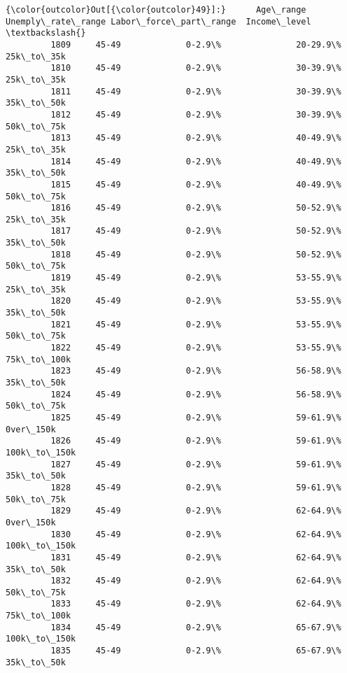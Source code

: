 \documentclass[11pt]{article}
\begin{document}
\begin{Verbatim}[commandchars=\\\{\}]
{\color{outcolor}Out[{\color{outcolor}49}]:}      Age\_range Unemply\_rate\_range Labor\_force\_part\_range  Income\_level  \textbackslash{}
         1809     45-49             0-2.9\%               20-29.9\%    25k\_to\_35k   
         1810     45-49             0-2.9\%               30-39.9\%    25k\_to\_35k   
         1811     45-49             0-2.9\%               30-39.9\%    35k\_to\_50k   
         1812     45-49             0-2.9\%               30-39.9\%    50k\_to\_75k   
         1813     45-49             0-2.9\%               40-49.9\%    25k\_to\_35k   
         1814     45-49             0-2.9\%               40-49.9\%    35k\_to\_50k   
         1815     45-49             0-2.9\%               40-49.9\%    50k\_to\_75k   
         1816     45-49             0-2.9\%               50-52.9\%    25k\_to\_35k   
         1817     45-49             0-2.9\%               50-52.9\%    35k\_to\_50k   
         1818     45-49             0-2.9\%               50-52.9\%    50k\_to\_75k   
         1819     45-49             0-2.9\%               53-55.9\%    25k\_to\_35k   
         1820     45-49             0-2.9\%               53-55.9\%    35k\_to\_50k   
         1821     45-49             0-2.9\%               53-55.9\%    50k\_to\_75k   
         1822     45-49             0-2.9\%               53-55.9\%   75k\_to\_100k   
         1823     45-49             0-2.9\%               56-58.9\%    35k\_to\_50k   
         1824     45-49             0-2.9\%               56-58.9\%    50k\_to\_75k   
         1825     45-49             0-2.9\%               59-61.9\%     0ver\_150k   
         1826     45-49             0-2.9\%               59-61.9\%  100k\_to\_150k   
         1827     45-49             0-2.9\%               59-61.9\%    35k\_to\_50k   
         1828     45-49             0-2.9\%               59-61.9\%    50k\_to\_75k   
         1829     45-49             0-2.9\%               62-64.9\%     0ver\_150k   
         1830     45-49             0-2.9\%               62-64.9\%  100k\_to\_150k   
         1831     45-49             0-2.9\%               62-64.9\%    35k\_to\_50k   
         1832     45-49             0-2.9\%               62-64.9\%    50k\_to\_75k   
         1833     45-49             0-2.9\%               62-64.9\%   75k\_to\_100k   
         1834     45-49             0-2.9\%               65-67.9\%  100k\_to\_150k   
         1835     45-49             0-2.9\%               65-67.9\%    35k\_to\_50k   

\end{Verbatim}
\end{document}
